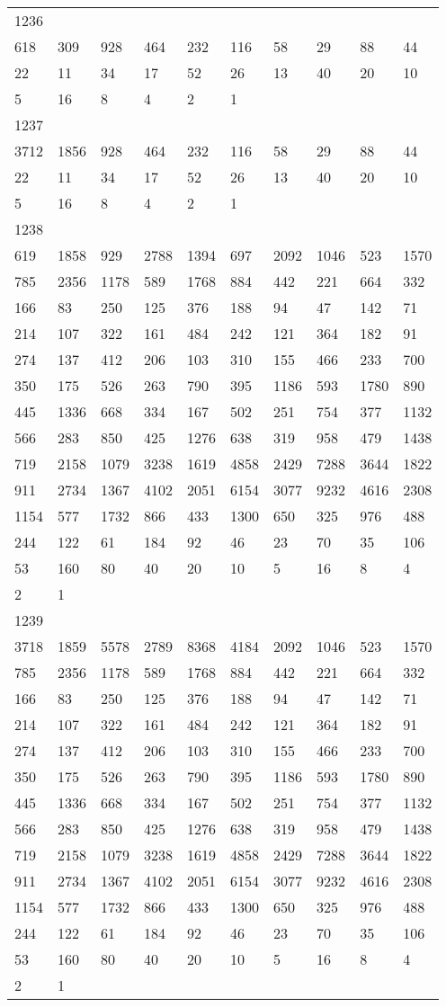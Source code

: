 \begin{longtable}{*{10}{l}}
1236&&&&&&&&&\\
618& 309& 928& 464& 232& 116& 58& 29& 88& 44\\
22& 11& 34& 17& 52& 26& 13& 40& 20& 10\\
5& 16& 8& 4& 2& 1& \\

1237&&&&&&&&&\\
3712& 1856& 928& 464& 232& 116& 58& 29& 88& 44\\
22& 11& 34& 17& 52& 26& 13& 40& 20& 10\\
5& 16& 8& 4& 2& 1& \\

1238&&&&&&&&&\\
619& 1858& 929& 2788& 1394& 697& 2092& 1046& 523& 1570\\
785& 2356& 1178& 589& 1768& 884& 442& 221& 664& 332\\
166& 83& 250& 125& 376& 188& 94& 47& 142& 71\\
214& 107& 322& 161& 484& 242& 121& 364& 182& 91\\
274& 137& 412& 206& 103& 310& 155& 466& 233& 700\\
350& 175& 526& 263& 790& 395& 1186& 593& 1780& 890\\
445& 1336& 668& 334& 167& 502& 251& 754& 377& 1132\\
566& 283& 850& 425& 1276& 638& 319& 958& 479& 1438\\
719& 2158& 1079& 3238& 1619& 4858& 2429& 7288& 3644& 1822\\
911& 2734& 1367& 4102& 2051& 6154& 3077& 9232& 4616& 2308\\
1154& 577& 1732& 866& 433& 1300& 650& 325& 976& 488\\
244& 122& 61& 184& 92& 46& 23& 70& 35& 106\\
53& 160& 80& 40& 20& 10& 5& 16& 8& 4\\
2& 1& \\

1239&&&&&&&&&\\
3718& 1859& 5578& 2789& 8368& 4184& 2092& 1046& 523& 1570\\
785& 2356& 1178& 589& 1768& 884& 442& 221& 664& 332\\
166& 83& 250& 125& 376& 188& 94& 47& 142& 71\\
214& 107& 322& 161& 484& 242& 121& 364& 182& 91\\
274& 137& 412& 206& 103& 310& 155& 466& 233& 700\\
350& 175& 526& 263& 790& 395& 1186& 593& 1780& 890\\
445& 1336& 668& 334& 167& 502& 251& 754& 377& 1132\\
566& 283& 850& 425& 1276& 638& 319& 958& 479& 1438\\
719& 2158& 1079& 3238& 1619& 4858& 2429& 7288& 3644& 1822\\
911& 2734& 1367& 4102& 2051& 6154& 3077& 9232& 4616& 2308\\
1154& 577& 1732& 866& 433& 1300& 650& 325& 976& 488\\
244& 122& 61& 184& 92& 46& 23& 70& 35& 106\\
53& 160& 80& 40& 20& 10& 5& 16& 8& 4\\
2& 1& \\


\end{longtable}
